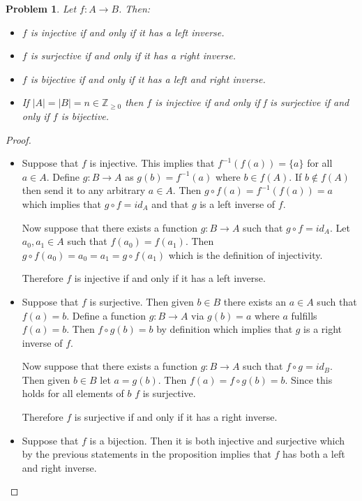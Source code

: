 \documentclass[10pt]{article}
\newcommand{\bb}[1]{\mathbb{#1}}
\newcommand{\ra}{\rightarrow}
\theoremstyle{plain}
\newtheorem{problem}{Problem}
\theoremstyle{remark}
\begin{document}
\begin{problem}
  Let $f:A\ra B$. Then:
  \begin{itemize}
  \item[a)] $f$ is injective if and only if it has a left inverse.
  \item[b)] $f$ is surjective if and only if it has a right inverse.
  \item[c)] $f$ is bijective if and only if it has a left and right inverse.
  \item[d)] If $|A|=|B|=n\in \bb{Z}_{\geq0}$ then $f$ is injective if and only if f is
    surjective if and only if $f$ is bijective.
  \end{itemize}
\end{problem}

\begin{proof}\ \\
  \begin{itemize}
  \item[a)] Suppose that $f$ is injective. This implies that $f^{-1}(f(a))=\{a\}$ for all
    $a\in A$. Define $g:B\ra A$ as $g(b)=f^{-1}(a)$ where $b\in f(A)$. If $b\notin f(A)$
    then send it to any arbitrary $a\in A$. Then $g\circ f(a)=f^{-1}(f(a))=a$ which implies
    that $g\circ f=id_A$ and that $g$ is a left inverse of $f$.

    Now suppose that there exists a function $g:B\ra A$ such that $g\circ f = id_A$.
    Let $a_0,a_1\in A$ such that $f(a_0)=f(a_1)$. Then
    $g\circ f(a_0)=a_0=a_1=g\circ f(a_1)$ which is the definition of injectivity.

    Therefore $f$ is injective if and only if it has a left inverse.
  \item[b)] Suppose that $f$ is surjective. Then given $b\in B$ there exists an $a\in A$
    such that $f(a)=b$. Define a function $g:B\ra A$ via $g(b)=a$ where $a$ fulfills
    $f(a)=b$. Then $f\circ g(b)=b$ by definition which implies that $g$ is a right
    inverse of $f$.

    Now suppose that there exists a function $g:B\ra A$ such that $f\circ g= id_B$. Then
    given $b\in B$ let $a=g(b)$. Then $f(a)=f\circ g(b)=b$. Since this holds for all
    elements of $b$ $f$ is surjective.

    Therefore $f$ is surjective if and only if it has a right inverse.
  \item[c)] Suppose that $f$ is a bijection. Then it is both injective and surjective
    which by the previous statements in the proposition implies that $f$ has both
    a left and right inverse.


\end{itemize}
\end{proof}
\end{document}
